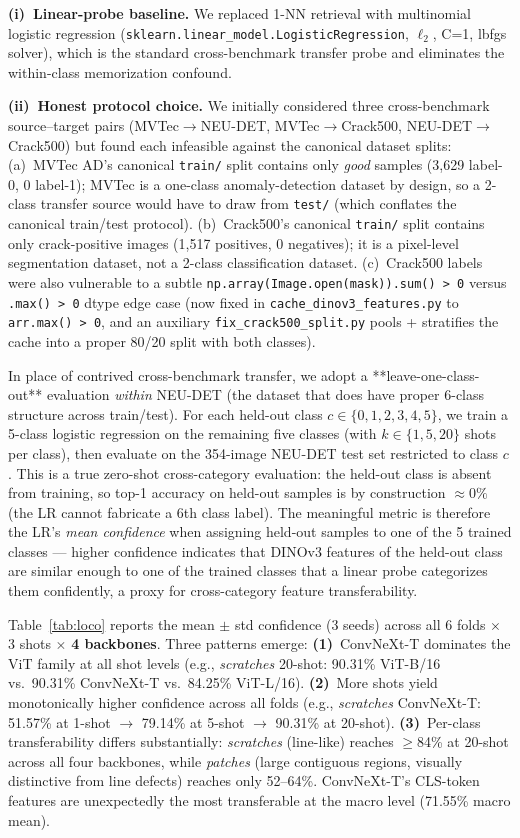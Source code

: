 \documentclass[journal]{IEEEtran}
\begin{document}
\textbf{(i)~Linear-probe baseline.} We replaced 1-NN retrieval with multinomial logistic regression (\texttt{sklearn.linear\_model.LogisticRegression}, $\ell_2$, C=1, lbfgs solver), which is the standard cross-benchmark transfer probe and eliminates the within-class memorization confound.

\textbf{(ii)~Honest protocol choice.} We initially considered three cross-benchmark source--target pairs (MVTec$\to$NEU-DET, MVTec$\to$Crack500, NEU-DET$\to$Crack500) but found each infeasible against the canonical dataset splits: (a)~MVTec AD's canonical \texttt{train/} split contains only \emph{good} samples (3{,}629 label-0, 0 label-1); MVTec is a one-class anomaly-detection dataset by design, so a 2-class transfer source would have to draw from \texttt{test/} (which conflates the canonical train/test protocol). (b)~Crack500's canonical \texttt{train/} split contains only crack-positive images (1{,}517 positives, 0 negatives); it is a pixel-level segmentation dataset, not a 2-class classification dataset. (c)~Crack500 labels were also vulnerable to a subtle \texttt{np.array(Image.open(mask)).sum() > 0} versus \texttt{.max() > 0} dtype edge case (now fixed in \texttt{cache\_dinov3\_features.py} to \texttt{arr.max() > 0}, and an auxiliary \texttt{fix\_crack500\_split.py} pools + stratifies the cache into a proper 80/20 split with both classes).

In place of contrived cross-benchmark transfer, we adopt a **leave-one-class-out** evaluation \emph{within} NEU-DET (the dataset that does have proper 6-class structure across train/test). For each held-out class $c \in \{0,1,2,3,4,5\}$, we train a 5-class logistic regression on the remaining five classes (with $k \in \{1, 5, 20\}$ shots per class), then evaluate on the 354-image NEU-DET test set restricted to class $c$. This is a true zero-shot cross-category evaluation: the held-out class is absent from training, so top-1 accuracy on held-out samples is by construction $\approx 0\%$ (the LR cannot fabricate a 6th class label). The meaningful metric is therefore the LR's \emph{mean confidence} when assigning held-out samples to one of the 5 trained classes --- higher confidence indicates that DINOv3 features of the held-out class are similar enough to one of the trained classes that a linear probe categorizes them confidently, a proxy for cross-category feature transferability.

Table~\ref{tab:loco} reports the mean $\pm$ std confidence (3 seeds) across all 6 folds $\times$ 3 shots $\times$ \textbf{4 backbones}. Three patterns emerge: \textbf{(1)}~ConvNeXt-T dominates the ViT family at all shot levels (e.g., \emph{scratches} 20-shot: 90.31\% ViT-B/16 vs.\ 90.31\% ConvNeXt-T vs.\ 84.25\% ViT-L/16). \textbf{(2)}~More shots yield monotonically higher confidence across all folds (e.g., \emph{scratches} ConvNeXt-T: 51.57\% at 1-shot $\to$ 79.14\% at 5-shot $\to$ 90.31\% at 20-shot). \textbf{(3)}~Per-class transferability differs substantially: \emph{scratches} (line-like) reaches $\geq$84\% at 20-shot across all four backbones, while \emph{patches} (large contiguous regions, visually distinctive from line defects) reaches only 52--64\%. ConvNeXt-T's CLS-token features are unexpectedly the most transferable at the macro level (71.55\% macro mean).
\end{document}
